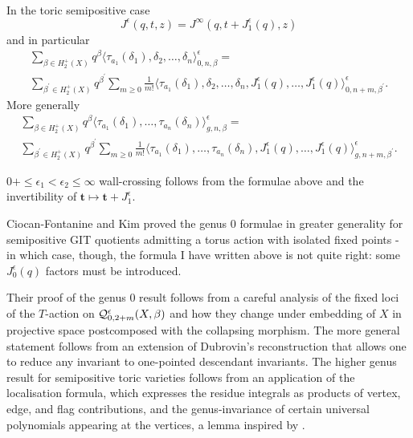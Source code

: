 \begin{thm}\label{thm:wcf}\cite[Theorem 1.2.2]{CF-K-wallcrossing}
 In the toric semipositive case 
 \[ J^\epsilon(q,t,z)=J^\infty(q,t+J^\epsilon_1(q),z)\]
 and in particular
 \begin{multline*} \sum_{\beta\in H_2^+(X)}q^\beta\langle\tau_{a_1}(\delta_1),\delta_2,\ldots,\delta_n\rangle^\epsilon_{0,n,\beta}= \\ \sum_{\beta^\prime\in H_2^+(X)}q^{\beta^\prime}\sum_{m\geq 0}\frac{1}{m!}\langle\tau_{a_1}(\delta_1),\delta_2,\ldots,\delta_n,J^\epsilon_1(q),\ldots,J^\epsilon_1(q)\rangle^\epsilon_{0,n+m,\beta^\prime}.\end{multline*}
 More generally \cite[Theorem 1.3.2]{CF-K-higher-genus}
 \begin{multline*} \sum_{\beta\in H_2^+(X)}q^\beta\langle\tau_{a_1}(\delta_1),\ldots,\tau_{a_n}(\delta_n)\rangle^\epsilon_{g,n,\beta}= \\ \sum_{\beta^\prime\in H_2^+(X)}q^{\beta^\prime}\sum_{m\geq 0}\frac{1}{m!}\langle\tau_{a_1}(\delta_1),\ldots,\tau_{a_n}(\delta_n),J^\epsilon_1(q),\ldots,J^\epsilon_1(q)\rangle^\epsilon_{g,n+m,\beta^\prime}.\end{multline*}
\end{thm}
\begin{rmk} $0+\leq \epsilon_1<\epsilon_2\leq\infty$ wall-crossing follows from the formulae above and the invertibility of $\mathbf t\mapsto \mathbf t+J^\epsilon_1$.
\end{rmk}
\begin{rmk} Ciocan-Fontanine and Kim proved the genus $0$ formulae in greater generality for semipositive GIT quotients admitting a torus action with isolated fixed points - in which case, though, the formula I have written above is not quite right: some $J^\epsilon_0(q)$ factors must be introduced.
            
Their proof of the genus $0$ result follows from a careful analysis of the fixed loci of the $T$-action on $\mathcal{Q}^{\epsilon}_{0,2+m}(X,\beta)$ and how they change under embedding of $X$ in projective space postcomposed with the collapsing morphism. The more general statement follows from an extension of Dubrovin's reconstruction that allows one to reduce any invariant to one-pointed descendant invariants. The higher genus result for semipositive toric varieties follows from an application of the localisation formula, which expresses the residue integrals as products of vertex, edge, and flag contributions, and the genus-invariance of certain universal polynomials appearing at the vertices, a lemma inspired by \cite[\S 7.6]{MOP}.
\end{rmk}

